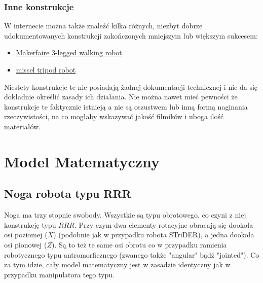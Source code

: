 \documentclass[a4paper,13pt]{article}
\begin{document}
\subsubsection{Inne konstrukcje}
W internecie można także znaleźć kilka różnych, niezbyt dobrze udokumentowanych konstrukcji zakończonych mniejszym lub większym sukcesem:
\begin{itemize}
\item \href{https://makerfaire.com/maker/entry/71669/}{Makerfaire 3-legged walking robot}
\item \href{https://youtu.be/HGEhCCUgFMg}{missel tripod robot}
\end{itemize}

Niestety konstrukcje te nie posiadają żadnej dokumentacji technicznej i nie da się dokładnie określić zasady ich działania. Nie można nawet mieć pewności że konstrukcje te faktycznie istnieją a nie są oszustwem lub inną formą naginania rzeczywistości, na co mogłaby wskazywać jakość filmików i uboga ilość materiałów.\\

\section{Model Matematyczny}

\subsection{Noga robota typu RRR}

Noga ma trzy stopnie swobody. Wszystkie są typu obrotowego, co czyni z niej konstrukcję typu $RRR$. Przy czym dwa elementy rotacyjne obracają się dookoła osi poziomej ($X$) (podobnie jak w przypadku robota STriDER), a jedna dookoła osi pionowej ($Z$). Są to też te same osi obrotu co w przypadku ramienia robotycznego typu antromorficznego (zwanego także "angular" bądź "jointed"). Co za tym idzie, cały model matematyczny jest w zasadzie identyczny jak w przypadku manipulatora tego typu.\\
\end{document}
